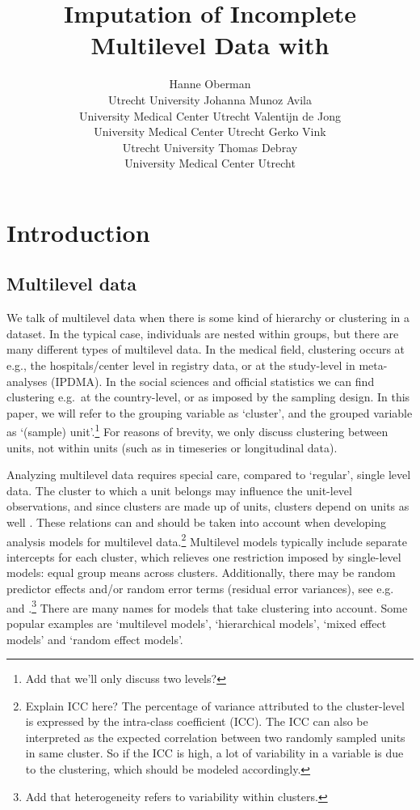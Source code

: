 \documentclass[
]{jss}
\author{
Hanne Oberman\\Utrecht University \And Johanna Munoz Avila\\University
Medical Center Utrecht \AND Valentijn de Jong\\University Medical
Center Utrecht \And Gerko Vink\\Utrecht University \AND Thomas
Debray\\University Medical Center Utrecht
}
\title{Imputation of Incomplete Multilevel Data with \pkg{mice}}
\begin{document}
\hypertarget{introduction}{%
\section{Introduction}\label{introduction}}

\hypertarget{multilevel-data}{%
\subsection{Multilevel data}\label{multilevel-data}}

We talk of multilevel data when there is some kind of hierarchy or
clustering in a dataset. In the typical case, individuals are nested
within groups, but there are many different types of multilevel data. In
the medical field, clustering occurs at e.g., the hospitals/center level
in registry data, or at the study-level in meta-analyses (IPDMA). In the
social sciences and official statistics we can find clustering e.g.~at
the country-level, or as imposed by the sampling design. In this paper,
we will refer to the grouping variable as `cluster', and the grouped
variable as `(sample) unit'.\footnote{Add that we'll only discuss two
  levels?} For reasons of brevity, we only discuss clustering between
units, not within units (such as in timeseries or longitudinal data).

Analyzing multilevel data requires special care, compared to `regular',
single level data. The cluster to which a unit belongs may influence the
unit-level observations, and since clusters are made up of units,
clusters depend on units as well \citep{hox17}. These relations can and
should be taken into account when developing analysis models for
multilevel data.\footnote{Explain ICC here? The percentage of variance
  attributed to the cluster-level is expressed by the intra-class
  coefficient (ICC). The ICC can also be interpreted as the expected
  correlation between two randomly sampled units in same cluster. So if
  the ICC is high, a lot of variability in a variable is due to the
  clustering, which should be modeled accordingly.} Multilevel models
typically include separate intercepts for each cluster, which relieves
one restriction imposed by single-level models: equal group means across
clusters. Additionally, there may be random predictor effects and/or
random error terms (residual error variances), see e.g. \citet{hox17}
and \citet{jong21}.\footnote{Add that heterogeneity refers to
  variability within clusters.} There are many names for models that
take clustering into account. Some popular examples are `multilevel
models', `hierarchical models', `mixed effect models' and `random effect
models'.
\end{document}
